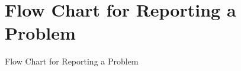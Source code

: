 \documentclass[letterpaper,10pt,english]{sphinxmanual}
\begin{document}
\section{Flow Chart for Reporting a Problem}
\label{unifieddoc:flow-chart-for-reporting-a-problem}\begin{figure}[htbp]
\centering

\end{figure}

Flow Chart for Reporting a Problem
\end{document}
